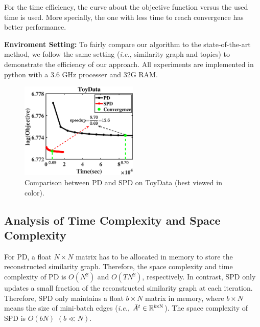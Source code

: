 \documentclass[runningheads]{llncs}
\begin{document}
For the time efficiency, the curve about the objective function versus the used time is used. More specially, the one with less time to reach convergence has better performance.

\textbf{Enviroment Setting:} To fairly compare our algorithm to the state-of-the-art method, we follow the same setting (\emph{i.e.}, similarity graph and topics) to demonstrate the efficiency of our approach. All experiments are implemented in python with a 3.6 GHz processer and 32G RAM.

\begin{figure}[t!]
\centering
\includegraphics[width=0.5\textwidth]{./results/cmp-objective-toydata/Objective.eps}
\caption{Comparison between PD and SPD on ToyData (best viewed in color).}
\label{fig:toydatacmp}
\end{figure}

\subsection{Analysis of Time Complexity and Space Complexity}
For PD, a float $N\times N$ matrix has to be allocated in memory to store the reconstructed similarity graph. Therefore, the space complexity and time complexity of PD is $O(N^2)$ and $O(TN^2)$, respectively. In contrast, SPD only updates a small fraction of the reconstructed similarity graph at each iteration. Therefore, SPD only maintains a float $b\times N$ matrix in memory, where $b\times N$ means the size of mini-batch edges (\emph{i.e.}, $\bar{A}^t\in \mathbb{R}^{b \rm x N}$). The space complexity of SPD is $O(bN)$ $(b\ll N)$.
\end{document}
